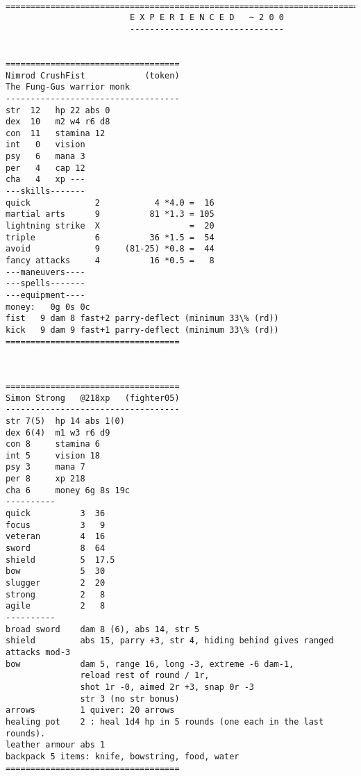 \

\goodbreak
\tiny \begin{samepage} \begin{verbatim}
================================================================================
                         E X P E R I E N C E D   ~ 2 0 0
                         -------------------------------


===================================
Nimrod CrushFist            (token)
The Fung-Gus warrior monk
-----------------------------------
str  12   hp 22 abs 0
dex  10   m2 w4 r6 d8
con  11   stamina 12
int   0   vision
psy   6   mana 3
per   4   cap 12
cha   4   xp ---
---skills-------
quick             2           4 *4.0 =  16
martial arts      9          81 *1.3 = 105
lightning strike  X                  =  20
triple            6          36 *1.5 =  54
avoid             9     (81-25) *0.8 =  44
fancy attacks     4          16 *0.5 =   8
---maneuvers----
---spells-------
---equipment----
money:   0g 0s 0c
fist   9 dam 8 fast+2 parry-deflect (minimum 33\% (rd))
kick   9 dam 9 fast+1 parry-deflect (minimum 33\% (rd))
===================================
\end{verbatim} \end{samepage} \normalsize


\

\goodbreak
\tiny \begin{samepage} \begin{verbatim}
===================================
Simon Strong   @218xp   (fighter05)
-----------------------------------
str 7(5)  hp 14 abs 1(0)
dex 6(4)  m1 w3 r6 d9
con 8     stamina 6
int 5     vision 18
psy 3     mana 7
per 8     xp 218
cha 6     money 6g 8s 19c
----------
quick          3  36
focus          3   9
veteran        4  16
sword          8  64
shield         5  17.5
bow            5  30
slugger        2  20
strong         2   8
agile          2   8
----------
broad sword    dam 8 (6), abs 14, str 5
shield         abs 15, parry +3, str 4, hiding behind gives ranged attacks mod-3
bow            dam 5, range 16, long -3, extreme -6 dam-1,
               reload rest of round / 1r,
               shot 1r -0, aimed 2r +3, snap 0r -3
               str 3 (no str bonus)
arrows         1 quiver: 20 arrows
healing pot    2 : heal 1d4 hp in 5 rounds (one each in the last rounds).
leather armour abs 1
backpack 5 items: knife, bowstring, food, water
===================================
\end{verbatim} \end{samepage} \normalsize


